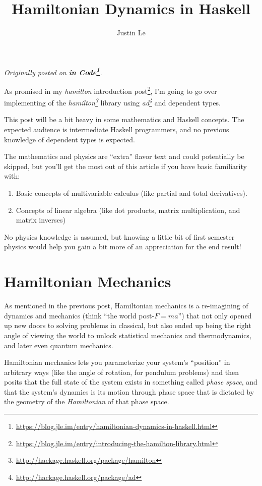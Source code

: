 \documentclass[]{article}
\title{Hamiltonian Dynamics in Haskell}
\author{Justin Le}
\renewcommand{\href}[2]{#2\footnote{\url{#1}}}
\begin{document}
\maketitle

\emph{Originally posted on
\textbf{\href{https://blog.jle.im/entry/hamiltonian-dynamics-in-haskell.html}{in
Code}}.}

As promised in my
\href{https://blog.jle.im/entry/introducing-the-hamilton-library.html}{\emph{hamilton}
introduction post}, I'm going to go over implementing of the
\emph{\href{http://hackage.haskell.org/package/hamilton}{hamilton}} library
using \emph{\href{http://hackage.haskell.org/package/ad}{ad}} and dependent
types.

This post will be a bit heavy in some mathematics and Haskell concepts. The
expected audience is intermediate Haskell programmers, and no previous knowledge
of dependent types is expected.

The mathematics and physics are ``extra'' flavor text and could potentially be
skipped, but you'll get the most out of this article if you have basic
familiarity with:

\begin{enumerate}
\def\labelenumi{\arabic{enumi}.}
\tightlist
\item
  Basic concepts of multivariable calculus (like partial and total derivatives).
\item
  Concepts of linear algebra (like dot products, matrix multiplication, and
  matrix inverses)
\end{enumerate}

No physics knowledge is assumed, but knowing a little bit of first semester
physics would help you gain a bit more of an appreciation for the end result!

\section{Hamiltonian Mechanics}\label{hamiltonian-mechanics}

As mentioned in the previous post, Hamiltonian mechanics is a re-imagining of
dynamics and mechanics (think ``the world post-\(F = m a\)'') that not only
opened up new doors to solving problems in classical, but also ended up being
the right angle of viewing the world to unlock statistical mechanics and
thermodynamics, and later even quantum mechanics.

Hamiltonian mechanics lets you parameterize your system's ``position'' in
arbitrary ways (like the angle of rotation, for pendulum problems) and then
posits that the full state of the system exists in something called \emph{phase
space}, and that the system's dynamics is its motion through phase space that is
dictated by the geometry of the \emph{Hamiltonian} of that phase space.
\end{document}
